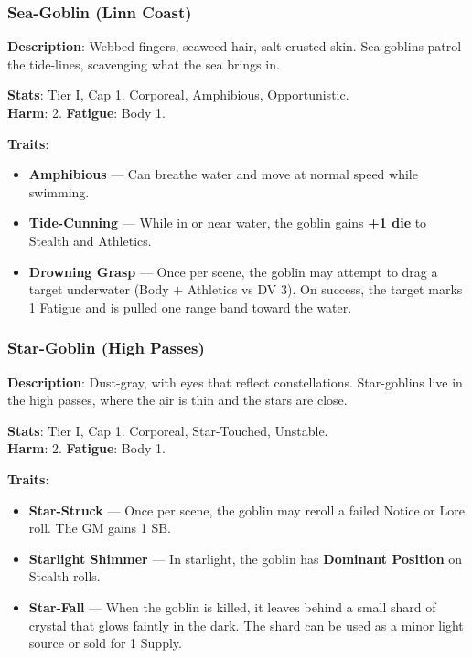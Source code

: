 \subsubsection{Sea-Goblin (Linn Coast)}

\textbf{Description}: Webbed fingers, seaweed hair, salt-crusted skin. Sea-goblins patrol the tide-lines, scavenging what the sea brings in.

\textbf{Stats}: Tier I, Cap 1. Corporeal, Amphibious, Opportunistic.\\
\textbf{Harm}: 2. \textbf{Fatigue}: Body 1.

\textbf{Traits}:
\begin{itemize}
    \item \textbf{Amphibious} --- Can breathe water and move at normal speed while swimming.
    \item \textbf{Tide-Cunning} --- While in or near water, the goblin gains \textbf{+1 die} to Stealth and Athletics.
    \item \textbf{Drowning Grasp} --- Once per scene, the goblin may attempt to drag a target underwater (Body + Athletics vs DV 3). On success, the target marks 1 Fatigue and is pulled one range band toward the water.
\end{itemize}

\subsubsection{Star-Goblin (High Passes)}

\textbf{Description}: Dust-gray, with eyes that reflect constellations. Star-goblins live in the high passes, where the air is thin and the stars are close.

\textbf{Stats}: Tier I, Cap 1. Corporeal, Star-Touched, Unstable.\\
\textbf{Harm}: 2. \textbf{Fatigue}: Body 1.

\textbf{Traits}:
\begin{itemize}
    \item \textbf{Star-Struck} --- Once per scene, the goblin may reroll a failed Notice or Lore roll. The GM gains 1 SB.
    \item \textbf{Starlight Shimmer} --- In starlight, the goblin has \textbf{Dominant Position} on Stealth rolls.
    \item \textbf{Star-Fall} --- When the goblin is killed, it leaves behind a small shard of crystal that glows faintly in the dark. The shard can be used as a minor light source or sold for 1 Supply.
\end{itemize}


